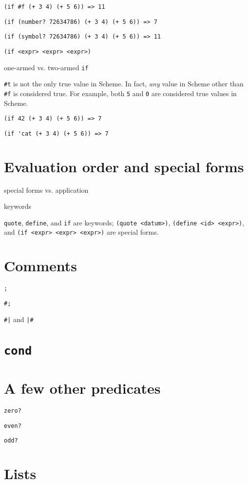 \documentclass{book}
\begin{document}
\verb|(if #f (+ 3 4) (+ 5 6)) => 11|

\verb|(if (number? 72634786) (+ 3 4) (+ 5 6)) => 7|

\verb|(if (symbol? 72634786) (+ 3 4) (+ 5 6)) => 11|

\verb|(if <expr> <expr> <expr>)|

one-armed vs. two-armed \verb|if|

\verb|#t| is not the only true value in Scheme.
In fact, \emph{any} value in Scheme other than \verb|#f| is considered true.
For example, both \verb|5| and \verb|0| are considered true values in Scheme.

\verb|(if 42 (+ 3 4) (+ 5 6)) => 7|

\verb|(if 'cat (+ 3 4) (+ 5 6)) => 7|

\section{Evaluation order and special forms}

special forms vs. application

keywords

\verb|quote|, \verb|define|, and \verb|if| are keywords; \verb|(quote <datum>)|, \verb|(define <id> <expr>)|, and \verb|(if <expr> <expr> <expr>)| are special forms.

\section{Comments}

\verb|;|

\verb|#;|

\texttt{\#|} and
\texttt{|\#}

\section{\texttt{cond}}

\section{A few other predicates}

\verb|zero?|

\verb|even?|

\verb|odd?|

\section{Lists}
\end{document}

